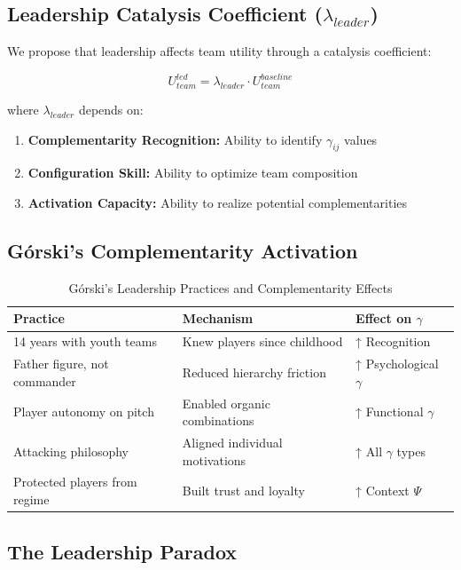 \subsection{Leadership Catalysis Coefficient ($\lambda_{leader}$)}

We propose that leadership affects team utility through a catalysis coefficient:

\begin{equation}
U_{team}^{led} = \lambda_{leader} \cdot U_{team}^{baseline}
\end{equation}

where $\lambda_{leader}$ depends on:

\begin{enumerate}
    \item \textbf{Complementarity Recognition:} Ability to identify $\gamma_{ij}$ values
    \item \textbf{Configuration Skill:} Ability to optimize team composition
    \item \textbf{Activation Capacity:} Ability to realize potential complementarities
\end{enumerate}

\subsection{Górski's Complementarity Activation}

\begin{table}[h]
\centering
\caption{Górski's Leadership Practices and Complementarity Effects}
\label{tab:gorski}
\begin{tabular}{lll}
\toprule
\textbf{Practice} & \textbf{Mechanism} & \textbf{Effect on $\gamma$} \\
\midrule
14 years with youth teams & Knew players since childhood & ↑ Recognition \\
Father figure, not commander & Reduced hierarchy friction & ↑ Psychological $\gamma$ \\
Player autonomy on pitch & Enabled organic combinations & ↑ Functional $\gamma$ \\
Attacking philosophy & Aligned individual motivations & ↑ All $\gamma$ types \\
Protected players from regime & Built trust and loyalty & ↑ Context $\Psi$ \\
\bottomrule
\end{tabular}
\end{table}

\subsection{The Leadership Paradox}

